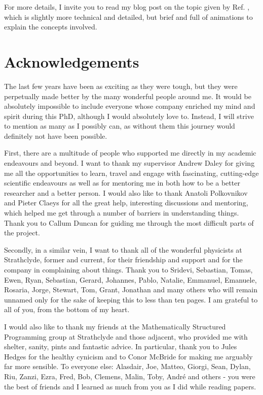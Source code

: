 \documentclass[a4paper,oneside,11pt]{book}
\begin{document}
For more details, I invite you to read my blog post on the topic given by Ref. \cite{cepaite_cold_2023}, which is slightly more technical and detailed, but brief and full of animations to explain the concepts involved. 

\chapter{Acknowledgements}

The last few years have been as exciting as they were tough, but they were perpetually made better by the many wonderful people around me. It would be absolutely impossible to include everyone whose company enriched my mind and spirit during this PhD, although I would absolutely love to. Instead, I will strive to mention as many as I possibly can, as without them this journey would definitely not have been possible.

First, there are a multitude of people who supported me directly in my academic endeavours and beyond. I want to thank my supervisor Andrew Daley for giving me all the opportunities to learn, travel and engage with fascinating, cutting-edge scientific endeavours as well as for mentoring me in both how to be a better researcher and a better person. I would also like to thank Anatoli Polkovnikov and Pieter Claeys for all the great help, interesting discussions and mentoring, which helped me get through a number of barriers in understanding things. Thank you to Callum Duncan for guiding me through the most difficult parts of the project.

Secondly, in a similar vein, I want to thank all of the wonderful physicists at Strathclyde, former and current, for their friendship and support and for the company in complaining about things. Thank you to Sridevi, Sebastian, Tomas, Ewen, Ryan, Sebastian, Gerard, Johannes, Pablo, Natalie, Emmanuel, Emanuele, Rosaria, Jorge, Stewart, Tom, Grant, Jonathan and many others who will remain unnamed only for the sake of keeping this to less than ten pages. I am grateful to all of you, from the bottom of my heart. 

I would also like to thank my friends at the Mathematically Structured Programming group at Strathclyde and those adjacent, who provided me with shelter, sanity, pints and fantastic advice. In particular, thank you to Jules Hedges for the healthy cynicism and to Conor McBride for making me arguably far more sensible. To everyone else: Alasdair, Joe, Matteo, Giorgi, Sean, Dylan, Riu, Zanzi, Ezra, Fred, Bob, Clemens, Malin, Toby, André and others - you were the best of friends and I learned as much from you as I did while reading papers.
\end{document}
